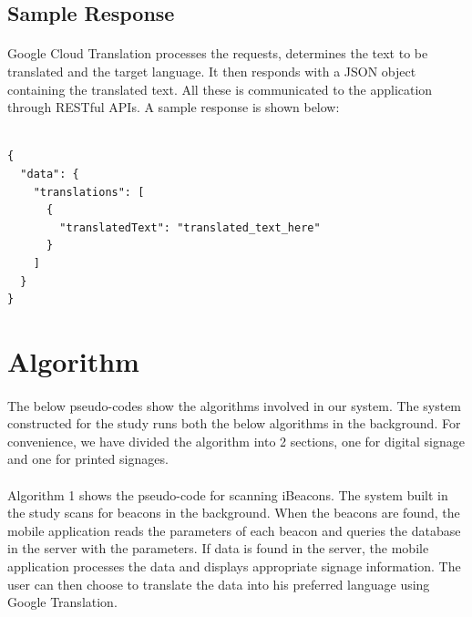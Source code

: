 \documentclass[12pt]{article}
\begin{document}
\subsection{Sample Response}

\paragraph{} Google Cloud Translation processes the requests, determines the text to be translated  and the target language. It then responds with a JSON object containing the translated text. All these is communicated to the application through RESTful APIs. A sample response is shown below:

\begin{lstlisting}

{
  "data": {
    "translations": [
      {
        "translatedText": "translated_text_here"
      }
    ]
  }
}
\end{lstlisting}



\section{Algorithm}

\paragraph{}The below pseudo-codes show the algorithms involved in our system. The system constructed for the study runs both the below algorithms in the background. For convenience, we have divided the algorithm into 2 sections, one for digital signage and one for printed signages. 


\paragraph{}Algorithm 1 shows the pseudo-code for scanning iBeacons. The system built in the study scans for beacons in the background. When the beacons are found, the mobile application reads the parameters of each beacon and queries the database in the server with the parameters. If data is found in the server, the mobile application processes the data and displays appropriate signage information. The user can then choose to translate the data into his preferred language using Google Translation.
\end{document}
